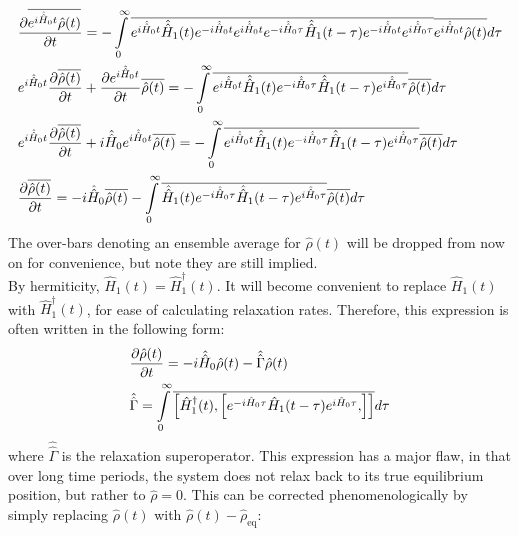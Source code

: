 \begin{appendixtext}
\begin{equation}
\label{eqA.19}
\begin{split}
&\pdv{\overline{e^{i \hat{\hat{H}}_0 t} \hat{\rho}(t)}}{t} = -\int \limits_0^{\infty} \overline{e^{i \hat{\hat{H}}_0 t} \hat{\hat{H}}_1(t) e^{-i \hat{\hat{H}}_0 t} e^{i \hat{\hat{H}}_0 t} e^{-i \hat{\hat{H}}_0 \tau} \hat{\hat{H}}_1(t - \tau) e^{-i \hat{\hat{H}}_0 t} e^{i \hat{\hat{H}}_0 \tau}} \overline{e^{i \hat{\hat{H}}_0 t} \hat{\rho}(t)} d \tau \\
&e^{i \hat{\hat{H}}_0 t} \pdv{\overline{\hat{\rho} (t)}}{t} + \pdv{e^{i \hat{\hat{H}}_0 t}}{t} \overline{\hat{\rho} (t)} = -\int \limits_0^{\infty} \overline{e^{i \hat{\hat{H}}_0 t} \hat{\hat{H}}_1(t) e^{-i \hat{\hat{H}}_0 \tau} \hat{\hat{H}}_1(t - \tau) e^{i \hat{\hat{H}}_0 \tau}} \overline{\hat{\rho}(t)} d \tau \\
&e^{i \hat{\hat{H}}_0 t} \pdv{\overline{\hat{\rho} (t)}}{t} + i \hat{\hat{H}}_0 e^{i \hat{\hat{H}}_0 t} \overline{\hat{\rho} (t)} = -\int \limits_0^{\infty} \overline{e^{i \hat{\hat{H}}_0 t} \hat{\hat{H}}_1(t) e^{-i \hat{\hat{H}}_0 \tau} \hat{\hat{H}}_1(t - \tau) e^{i \hat{\hat{H}}_0 \tau}} \overline{\hat{\rho}(t)} d \tau \\
&\pdv{\overline{\hat{\rho} (t)}}{t} = -i \hat{\hat{H}}_0 \overline{\hat{\rho} (t)} -\int \limits_0^{\infty} \overline{\hat{\hat{H}}_1(t) e^{-i \hat{\hat{H}}_0 \tau} \hat{\hat{H}}_1(t - \tau) e^{i \hat{\hat{H}}_0 \tau}} \overline{\hat{\rho}(t)} d \tau
\end{split}
\end{equation}
The over-bars denoting an ensemble average for $\hat{\rho} (t)$ will be dropped from now on for convenience, but note they are still implied. \\
By hermiticity, $\hat{H}_1 (t) = \hat{H}_1^{\dagger} (t)$. It will become convenient to replace $\hat{H}_1 (t)$ with $\hat{H}_1^{\dagger} (t)$, for ease of calculating relaxation rates. Therefore, this expression is often written in the following form:
\begin{equation}
\label{eqA.20}
\begin{split}
&\pdv{\hat{\rho} (t)}{t} = -i \hat{\hat{H}}_0\hat{\rho} (t) - \hat{\hat{\Gamma}} \hat{\rho} (t) \\
&\hat{\hat{\Gamma}} = \int \limits_0^{\infty} \overline{\comm{\hat{H}_1^{\dagger} (t)}{\comm{e^{-i \hat{H}_0 \tau} \hat{H}_1(t - \tau) e^{i \hat{H}_0 \tau}}{}}} d \tau
\end{split}
\end{equation}
where $\hat{\hat{\Gamma}}$ is the relaxation superoperator. This expression has a major flaw, in that over long time periods, the system does not relax back to its true equilibrium position, but rather to $\hat{\rho}=0$. This can be corrected phenomenologically by simply replacing $\hat{\rho}(t)$ with $\hat{\rho}(t)-\hat{\rho}_{\text{eq}}$: 

\end{appendixtext}
